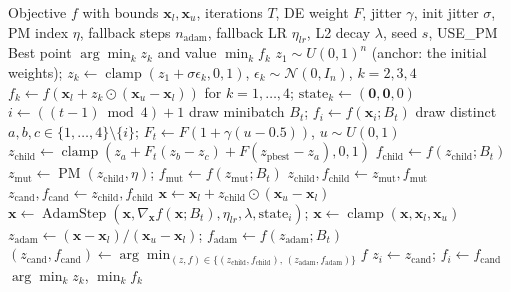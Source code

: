 \begin{algorithm}[H]
\caption{EvE (Evolutionary Explorer)}
\label{alg:eve}
\begin{algorithmic}[1]
\Require Objective $f$ with bounds $\mathbf{x}_l, \mathbf{x}_u$, iterations $T$, DE weight $F$, jitter $\gamma$, init jitter $\sigma$, PM index $\eta$, fallback steps $n_{\text{adam}}$, fallback LR $\eta_{lr}$, L2 decay $\lambda$, seed $s$, USE\_PM
\Ensure Best point $\arg\min_k z_k$ and value $\min_k f_k$
\State $z_1 \sim U(0,1)^n$ (anchor: the initial weights); $z_k \gets \operatorname{clamp}(z_1 + \sigma\epsilon_k, 0, 1)$, $\epsilon_k \sim \mathcal{N}(0, I_n)$, $k = 2,3,4$ 
\State $f_k \gets f(\mathbf{x}_l + z_k \odot (\mathbf{x}_u - \mathbf{x}_l))$ for $k = 1,\dots,4$; $\text{state}_k \gets (\mathbf{0}, \mathbf{0}, 0)$ 
    \State $i \gets ((t - 1) \bmod 4) + 1$ 
    \State draw minibatch $B_t$; $f_i \gets f(\mathbf{x}_i; B_t)$ 
    \State draw distinct $a, b, c \in \{1,\dots,4\} \setminus \{i\}$; $F_t \gets F(1 + \gamma(u - 0.5))$, $u \sim U(0,1)$
    \State $z_{\text{child}} \gets \operatorname{clamp}(z_a + F_t(z_b - z_c) + F(z_{\text{pbest}} - z_a), 0, 1)$
    \State $f_{\text{child}} \gets f(z_{\text{child}}; B_t)$
     
        \State $z_{\text{mut}} \gets \operatorname{PM}(z_{\text{child}}, \eta)$; $f_{\text{mut}} \gets f(z_{\text{mut}}; B_t)$
         $z_{\text{child}}, f_{\text{child}} \gets z_{\text{mut}}, f_{\text{mut}}$ \EndIf
    \EndIf
        \State $z_{\text{cand}}, f_{\text{cand}} \gets z_{\text{child}}, f_{\text{child}}$
    \Else
        \State $\mathbf{x} \gets \mathbf{x}_l + z_{\text{child}} \odot (\mathbf{x}_u - \mathbf{x}_l)$
         
            \State $\mathbf{x} \gets \operatorname{AdamStep}(\mathbf{x}, \nabla_{\mathbf{x}} f(\mathbf{x}; B_t), \eta_{lr}, \lambda, \text{state}_i)$; \quad $\mathbf{x} \gets \operatorname{clamp}(\mathbf{x}, \mathbf{x}_l, \mathbf{x}_u)$
        \EndFor
        \State $z_{\text{adam}} \gets (\mathbf{x} - \mathbf{x}_l)/(\mathbf{x}_u - \mathbf{x}_l)$; \quad $f_{\text{adam}} \gets f(z_{\text{adam}}; B_t)$
        \State $(z_{\text{cand}}, f_{\text{cand}}) \gets \arg\min_{(z, f) \in \{(z_{\text{child}}, f_{\text{child}}),\, (z_{\text{adam}}, f_{\text{adam}})\}} f$
    \EndIf
     $z_i \gets z_{\text{cand}}$; \quad $f_i \gets f_{\text{cand}}$  \EndIf
\EndFor
\State \Return $\arg\min_k z_k$, $\min_k f_k$
\end{algorithmic}
\end{algorithm}

